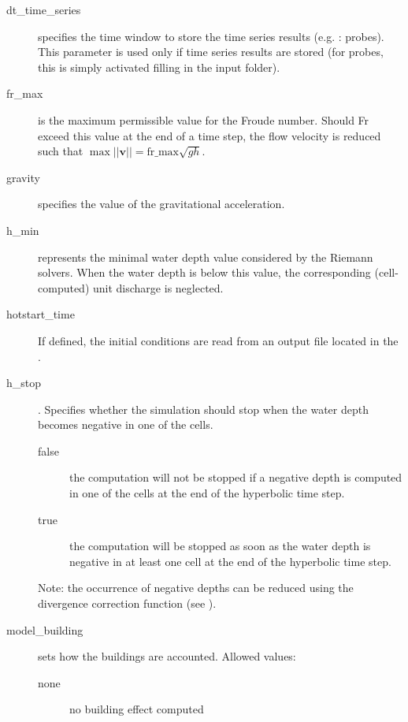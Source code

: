 \begin{description}
\item[dt\_time\_series] specifies the time window to store the time series results (e.g. : probes). This parameter is used only if time series results are stored (for probes, this is simply activated filling  in the input folder).

\item[fr\_max]  is the maximum permissible value for the Froude number. Should Fr exceed this value at the end of a time step, the flow velocity is reduced such that $\max ||\mathbf{v}|| = \mathrm{fr\_max} \sqrt{gh}$.

\item[gravity] specifies the value of the gravitational acceleration.

\item[h\_min] represents the minimal water depth value considered by the Riemann solvers. When the water depth is below this value, the corresponding (cell-computed) unit discharge is neglected.

\item[hotstart\_time] If defined, the initial conditions are read from an output file located in the .

\item[h\_stop] . Specifies whether the simulation should stop when the water depth becomes negative in one of the cells. 
\begin{description}
	\item [false] the computation will not be stopped if a negative depth is computed in one of the cells at the end of the hyperbolic time step.
	\item [true] the computation will be stopped as soon as the water depth is negative in at least one cell at the end of the hyperbolic time step.
\end{description}
Note: the occurrence of negative depths can be reduced using the divergence correction function (see ).

\item[model\_building] sets how the buildings are accounted. Allowed values:
\begin{description}
    \item[none] no building effect computed
\end{description}


\end{description}
